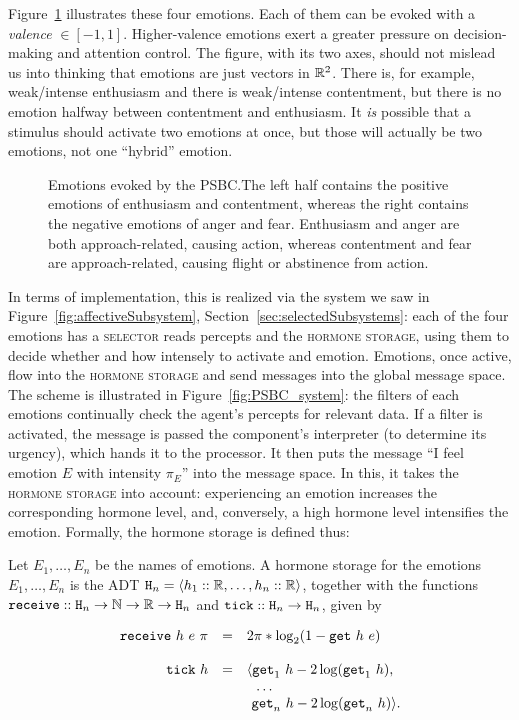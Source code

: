 Figure~\ref{fig:PSBC} illustrates these four emotions. Each of them can be evoked with a {\em valence} $\in [-1,1]$. Higher-valence emotions exert a greater pressure on decision-making and attention control. The figure, with its two axes, should not mislead us into thinking that emotions are just vectors in $\mathbb{R}^2$. There is, for example, weak/intense enthusiasm and there is weak/intense contentment, but there is no emotion halfway between contentment and enthusiasm. It {\em is} possible that a stimulus should activate two emotions at once, but those will actually be two emotions, not one ``hybrid'' emotion.

\begin{figure}[!h]
	\centering
	
	\caption{Emotions evoked by the \textsc{PSBC}.The left half contains the positive emotions of enthusiasm and contentment, whereas the right contains the negative emotions of anger and fear. Enthusiasm and anger are both approach-related, causing action, whereas contentment and fear are approach-related, causing flight or abstinence from action.}
	\label{fig:PSBC}
\end{figure}

In terms of implementation, this is realized via the system we saw in Figure~\ref{fig:affectiveSubsystem}, Section~\ref{sec:selectedSubsystems}: each of the four emotions has a \textsc{selector} reads percepts and the \textsc{hormone storage}, using them to decide whether and how intensely to activate and emotion. Emotions, once active, flow into the \textsc{hormone storage} and send messages into the global message space. The scheme is illustrated in Figure~\ref{fig:PSBC_system}: the filters of each emotions continually check the agent's percepts for relevant data. If a filter is activated, the message is passed the component's interpreter (to determine its urgency), which hands it to the processor. It then puts the message ``I feel emotion $E$ with intensity $\pi_E$'' into the message space. In this, it takes the \textsc{hormone storage} into account: experiencing an emotion increases the corresponding hormone level, and, conversely, a high hormone level intensifies the emotion. Formally, the hormone storage is defined thus:

\begin{definition}
	Let $E_1,\dots,E_n$ be the names of emotions. A hormone storage for the emotions $E_1,\dots,E_n$ is the ADT $\mathtt{H}_n = \langle h_1 :: \mathbb{R}, \dots, h_n :: \mathbb{R} \rangle$, together with the functions $\mathtt{receive} :: \mathtt{H}_n \rightarrow \mathbb{N} \rightarrow \mathbb{R} \rightarrow \mathtt{H}_n$ and $\mathtt{tick} :: \mathtt{H}_n \rightarrow \mathtt{H}_n$, given by
	
	$$
		\begin{array}{r c l}
			\mathtt{receive}\ h\ e\ \pi & = & 2\pi * \log_2(1-\mathtt{get}\ h\ e)\\
			\\
			\mathtt{tick}\ h & = & \langle \mathtt{get}_1\ h - 2\log(\mathtt{get}_1\ h),\\
							 &   & \ \ \dots\\
							 &   & \ \mathtt{get}_n\ h - 2\log(\mathtt{get}_n\ h) \rangle.
		\end{array}
	$$
\end{definition}

